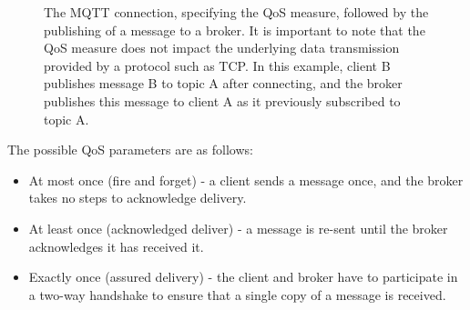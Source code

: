 \begin{figure}[ht]
\begin{center}
        \caption{The MQTT connection, specifying the QoS measure, followed by the publishing of a message to a broker. It is important to note that the QoS measure does not impact the underlying data transmission provided by a protocol such as TCP. In this example, client B publishes message B to topic A after connecting, and the broker publishes this message to client A as it previously subscribed to topic A.}
        \label{fig:mqtt}
    \end{center}
\end{figure}

The possible QoS parameters are as follows:

\begin{itemize}
    \item At most once (fire and forget) - a client sends a message once, and the broker takes no steps to acknowledge delivery.
    \item At least once (acknowledged deliver) - a message is re-sent until the broker acknowledges it has received it.
    \item Exactly once (assured delivery) - the client and broker have to participate in a two-way handshake to ensure that a single copy of a message is received.
\end{itemize}

